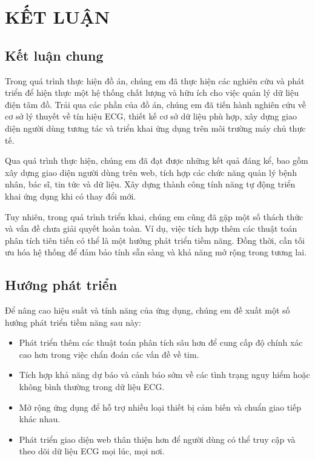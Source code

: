 
\section*{KẾT LUẬN}
\subsection*{Kết luận chung}


Trong quá trình thực hiện đồ án,
 chúng em đã thực hiện các nghiên cứu và phát 
 triển để hiện thực một hệ thống chất lượng và hữu ích
  cho việc quản lý dữ liệu điện tâm đồ. Trải qua các phần
   của đồ án, chúng em đã tiến hành nghiên cứu về cơ sở lý
    thuyết về tín hiệu ECG, thiết kế cơ sở dữ liệu phù hợp,
     xây dựng giao diện người dùng tương tác và triển khai
      ứng dụng trên môi trường máy chủ thực tế.

      Qua quá trình
      thực hiện, chúng em đã đạt được những kết quả đáng kể,
      bao gồm xây dựng giao diện người dùng trên web, tích hợp các
       chức năng quản lý bệnh nhân, bác sĩ, tin tức và dữ liệu. Xây dựng thành công tính năng tự động triển khai ứng dụng khi có thay đổi mới.



Tuy nhiên, trong quá trình triển khai, chúng em cũng đã gặp một số thách thức và vấn đề chưa giải quyết hoàn toàn. Ví dụ, việc tích hợp thêm các thuật toán phân tích tiên tiến có thể là một hướng phát triển tiềm năng. Đồng thời, cần tối ưu hóa hệ thống để đảm bảo tính sẵn sàng và khả năng mở rộng trong tương lai.

\subsection*{Hướng phát triển}


Để nâng cao hiệu suất và tính năng của ứng dụng, chúng em đề xuất một số hướng phát triển tiềm năng sau này:

\begin{adjustwidth}{1.5em}{}
  \begin{itemize}
      \item Phát triển thêm các thuật toán phân tích sâu hơn để cung cấp độ chính xác cao hơn trong việc chẩn đoán các vấn đề về tim.

  
      \item Tích hợp khả năng dự báo và cảnh báo sớm về các tình trạng nguy hiểm hoặc không bình thường trong dữ liệu ECG.

  
      \item Mở rộng ứng dụng để hỗ trợ nhiều loại thiết bị cảm biến và chuẩn giao tiếp khác nhau.

  
      \item  Phát triển giao diện web thân thiện hơn để người dùng có thể truy cập và theo dõi dữ liệu ECG mọi lúc, mọi nơi.

  \end{itemize}
  \end{adjustwidth}


